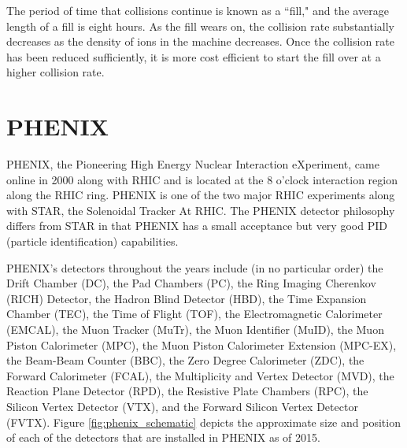 The period of time that collisions continue is known as a ``fill," and the average length of a fill is eight hours. As the fill wears on, the collision rate substantially decreases as the density of ions in the machine decreases. Once the collision rate has been reduced sufficiently, it is more cost efficient to start the fill over at a higher collision rate.  


\section{PHENIX}
PHENIX, the Pioneering High Energy Nuclear Interaction eXperiment, came online in 2000 along with RHIC and is located at the 8 o'clock interaction region along the RHIC ring. PHENIX is one of the two major RHIC experiments along with STAR, the Solenoidal Tracker At RHIC. The PHENIX detector philosophy differs from STAR in that PHENIX has a small acceptance but very good PID (particle identification) capabilities. 

PHENIX's detectors throughout the years include (in no particular order) the Drift Chamber (DC), the Pad Chambers (PC), the Ring Imaging Cherenkov (RICH) Detector, the Hadron Blind Detector (HBD), the Time Expansion Chamber (TEC), the Time of Flight (TOF), the Electromagnetic Calorimeter (EMCAL), the Muon Tracker (MuTr), the Muon Identifier (MuID), the Muon Piston Calorimeter (MPC), the Muon Piston Calorimeter Extension (MPC-EX), the Beam-Beam Counter (BBC), the Zero Degree Calorimeter (ZDC), the Forward Calorimeter (FCAL), the Multiplicity and Vertex Detector (MVD), the Reaction Plane Detector (RPD), the Resistive Plate Chambers (RPC), the Silicon Vertex Detector (VTX), and the Forward Silicon Vertex Detector (FVTX). Figure \ref{fig:phenix_schematic} depicts the approximate size and position of each of the detectors that are installed in PHENIX as of 2015.

